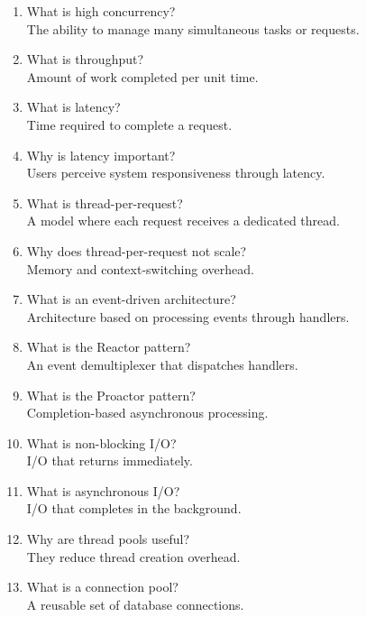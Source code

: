 \begin{enumerate}
\item What is high concurrency?\\
The ability to manage many simultaneous tasks or requests.

\item What is throughput?\\
Amount of work completed per unit time.

\item What is latency?\\
Time required to complete a request.

\item Why is latency important?\\
Users perceive system responsiveness through latency.

\item What is thread-per-request?\\
A model where each request receives a dedicated thread.

\item Why does thread-per-request not scale?\\
Memory and context-switching overhead.

\item What is an event-driven architecture?\\
Architecture based on processing events through handlers.

\item What is the Reactor pattern?\\
An event demultiplexer that dispatches handlers.

\item What is the Proactor pattern?\\
Completion-based asynchronous processing.

\item What is non-blocking I/O?\\
I/O that returns immediately.

\item What is asynchronous I/O?\\
I/O that completes in the background.

\item Why are thread pools useful?\\
They reduce thread creation overhead.

\item What is a connection pool?\\
A reusable set of database connections.


\end{enumerate}
